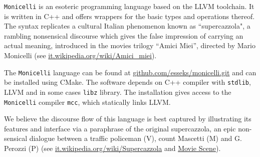 \documentclass[edipack_sp.tex]{subfiles}
\begin{document}
  
{\tt Monicelli} is an esoteric programming language based on the LLVM
toolchain.
It is written in C++ and offers wrappers for the basic
types and operations thereof. The syntax replicates a cultural Italian
phenomenon known as ``supercazzola", a rambling nonsensical discourse
which gives the false impression of carrying an actual meaning,
introduced in the movies trilogy ``Amici Miei'', directed by Mario
Monicelli (see \href{https://it.wikipedia.org/wiki/Amici_miei}{it.wikipedia.org/wiki/Amici\-\_\-miei}). 

The {\tt Monicelli} language can be found at
\href{https://github.com/esseks/monicelli.git}{github.com/esseks/monicelli.git}
and can be installed using CMake. The software depends on C++
compiler with {\tt stdlib}, LLVM and in some cases {\tt libz} library. The installation gives access to the {\tt
  Monicelli} compiler {\tt mcc}, which statically links LLVM. 

We believe the discourse flow of this language is best captured by 
illustrating its features and \NAME interface via a paraphrase of the original supercazzola, an epic non-sensical dialogue between a traffic policeman (V), count Mascetti (M) and G. Perozzi (P) (see
\href{https://it.wikipedia.org/wiki/Supercazzola#Origine}{it.wikipedia.org/wiki/Supercazzola}
and \href{https://www.youtube.com/watch?v=SF8YUFdP6eU}{Movie Scene}). 
\end{document}
